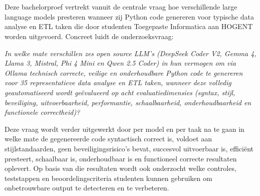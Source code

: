 
\section{}%
\label{sec:onderzoeksvraag}


Deze bachelorproef vertrekt vanuit de centrale vraag hoe verschillende large language models presteren wanneer zij Python code genereren voor typische data analyse en ETL taken die door studenten Toegepaste Informatica aan HOGENT worden uitgevoerd. Concreet luidt de onderzoeksvraag:

\textit{In welke mate verschillen zes open source LLM's (DeepSeek Coder V2, Gemma 4, Llama 3, Mistral, Phi 4 Mini en Qwen 2.5 Coder) in hun vermogen om via Ollama technisch correcte, veilige en onderhoudbare Python code te genereren voor 35 representatieve data analyse en ETL taken, wanneer deze volledig geautomatiseerd wordt geëvalueerd op acht evaluatiedimensies (syntax, stijl, beveiliging, uitvoerbaarheid, performantie, schaalbaarheid, onderhoudbaarheid en functionele correctheid)?}

Deze vraag wordt verder uitgewerkt door per model en per taak na te gaan in welke mate de gegenereerde code syntactisch correct is, voldoet aan stijlstandaarden, geen beveiligingsrisico's bevat, succesvol uitvoerbaar is, efficiënt presteert, schaalbaar is, onderhoudbaar is en functioneel correcte resultaten oplevert. Op basis van die resultaten wordt ook onderzocht welke controles, teststappen en beoordelingscriteria studenten kunnen gebruiken om onbetrouwbare output te detecteren en te verbeteren.


